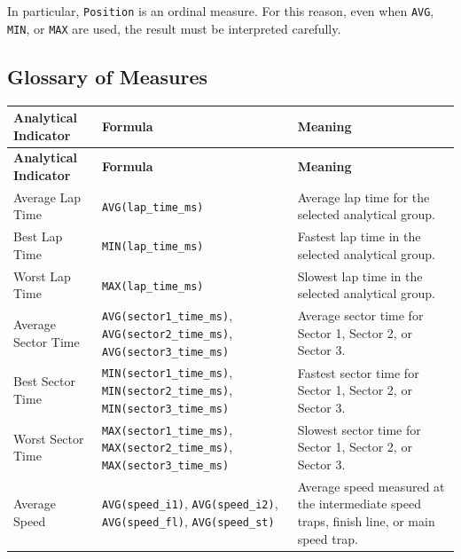 \documentclass[a4paper,11pt]{article}
\begin{document}
	In particular, \texttt{Position} is an ordinal measure. For this reason, even when
	\texttt{AVG}, \texttt{MIN}, or \texttt{MAX} are used, the result must be interpreted
	carefully.

	\subsection{Glossary of Measures}
	

	\begin{longtable}{|p{4.5cm}|p{5.2cm}|p{6cm}|}
		\hline
		\textbf{Analytical Indicator} & \textbf{Formula} & \textbf{Meaning} \\
		\hline
		\endfirsthead
		
		\hline
		\textbf{Analytical Indicator} & \textbf{Formula} & \textbf{Meaning} \\
		\hline
		\endhead
		
		Average Lap Time
		& \texttt{AVG(lap\_time\_ms)}
		& Average lap time for the selected analytical group. \\
		\hline
		
		Best Lap Time
		& \texttt{MIN(lap\_time\_ms)}
		& Fastest lap time in the selected analytical group. \\
		\hline
		
		Worst Lap Time
		& \texttt{MAX(lap\_time\_ms)}
		& Slowest lap time in the selected analytical group. \\
		\hline
		
		Average Sector Time
		& \texttt{AVG(sector1\_time\_ms)}, \texttt{AVG(sector2\_time\_ms)}, \texttt{AVG(sector3\_time\_ms)}
		& Average sector time for Sector 1, Sector 2, or Sector 3. \\
		\hline
		
		Best Sector Time
		& \texttt{MIN(sector1\_time\_ms)}, \texttt{MIN(sector2\_time\_ms)}, \texttt{MIN(sector3\_time\_ms)}
		& Fastest sector time for Sector 1, Sector 2, or Sector 3. \\
		\hline
		
		Worst Sector Time
		& \texttt{MAX(sector1\_time\_ms)}, \texttt{MAX(sector2\_time\_ms)}, \texttt{MAX(sector3\_time\_ms)}
		& Slowest sector time for Sector 1, Sector 2, or Sector 3. \\
		\hline
		
		Average Speed
		& \texttt{AVG(speed\_i1)}, \texttt{AVG(speed\_i2)}, \texttt{AVG(speed\_fl)}, \texttt{AVG(speed\_st)}
		& Average speed measured at the intermediate speed traps, finish line, or main speed trap. \\
		\hline
		

\end{longtable}
\end{document}
